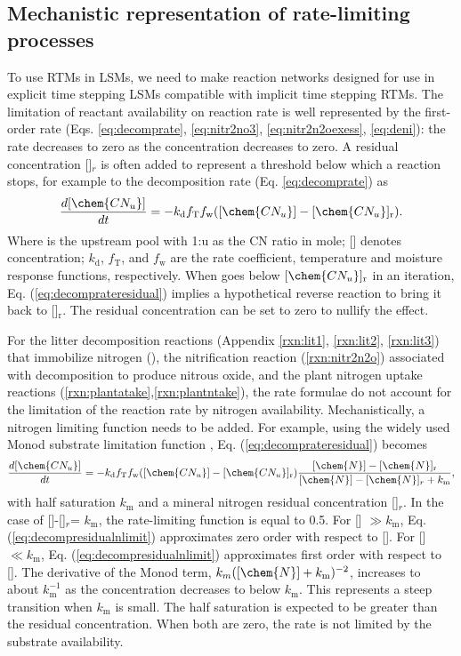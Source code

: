 \documentclass[gmd, manuscript]{copernicus}
\begin{document}
\subsection{Mechanistic representation of rate-limiting processes}
To use RTMs in LSMs, we need to make reaction networks designed for use in
explicit time stepping LSMs compatible with implicit time stepping RTMs. The
limitation of reactant availability on reaction rate is well represented by the
first-order rate (Eqs. \ref{eq:decomprate}, \ref{eq:nitr2no3},
\ref{eq:nitr2n2oexess}, \ref{eq:deni}): the rate decreases to zero as the
concentration decreases to zero. A residual concentration []$_r$ is often added to
represent a threshold below which a reaction stops, for example to the
decomposition rate (Eq. \ref{eq:decomprate}) as
\begin{equation}
\frac{d [\chem{CN_u}]}{d t} = -k_\text{d} f_\text{T} f_\text{w}
([\chem{CN_u}] - [\chem{CN_u}]_\text{r}).
\label{eq:decomprateresidual}
\end{equation}
Where  is the upstream pool with 1:u as the CN ratio in mole; []
denotes concentration; $k_\text{d}$, $f_\text{T}$, and $f_\text{w}$ are the
rate coefficient, temperature and moisture response functions, respectively. When 
goes below $[\chem{CN_u}]_\text{r}$ in an iteration, Eq.
(\ref{eq:decomprateresidual}) implies a hypothetical reverse reaction to bring
it back to []$_\text{r}$. The residual concentration can be set to
zero to nullify the effect.  

For the litter decomposition reactions (Appendix \ref{rxn:lit1}, \ref{rxn:lit2},
\ref{rxn:lit3}) that immobilize nitrogen (), the nitrification reaction
(\ref{rxn:nitr2n2o}) associated with decomposition to produce nitrous oxide,
and the plant nitrogen uptake reactions
(\ref{rxn:plantatake},\ref{rxn:plantntake}), the rate formulae do not account
for the limitation of the reaction rate by nitrogen availability.
Mechanistically, a nitrogen limiting function needs to be added. For example,
using the widely used Monod substrate limitation function \citep{Fennell1998},
Eq. (\ref{eq:decomprateresidual}) becomes 
\begin{equation}
\frac{d [\chem{CN_u}]}{d t} = -k_\text{d} f_\text{T} f_\text{w} ([\chem{CN_u}] -
[\chem{CN_u}]_\text{r}) \frac{[\chem{N}]-[\chem{N}]_\text{r}}{[\chem{N}]-[\chem{N}]_r +k_\text{m}},
\label{eq:decompresidualnlimit}
\end{equation}
with half saturation $k_\text{m}$ and a mineral nitrogen residual concentration
[]$_r$. In the case of []-[]$_r$= $k_\text{m}$, the
rate-limiting function is equal to 0.5. For [] $\gg k_\text{m}$, Eq.
(\ref{eq:decompresidualnlimit}) approximates zero order with respect to
[]. For []$\ll k_\text{m}$, Eq. (\ref{eq:decompresidualnlimit})
approximates first order with respect to []. The derivative of the
Monod term, ${k_m}{([\chem{N}]+k_\text{m})^{-2}}$, increases to about
$k_\text{m}^{-1}$ as the concentration decreases to below $k_\text{m}$. This
represents a steep transition when $k_\text{m}$ is small. The half saturation
is expected to be greater than the residual concentration. When both are zero,
the rate is not limited by the substrate availability. 
\end{document}
